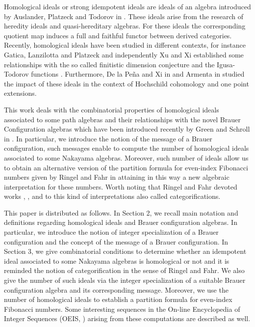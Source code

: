 \documentclass[10pt,twoside]{article}
\theoremstyle{definition}
\begin{document}
Homological ideals or strong idempotent ideals are ideals of an algebra introduced by  Auslander, Platzeck and Todorov in \cite{Auslander}. These ideals arise from the research of  heredity ideals and quasi-hereditary algebras. For these ideals the corresponding quotient map induces a full and faithful functor between derived categories. Recently, homological ideals have been studied in different contexts, for instance Gatica, Lanzilotta and Platzeck and independently Xu and Xi established some relationships with the so called finitistic dimension conjecture and the Igusa-Todorov functions \cite{Gatica}. Furthermore, De la Pe\~na and Xi  in \cite{JAP} and Armenta in \cite{Armenta} studied the impact of these ideals in the context of Hochschild cohomology and one point extensions.
\par\bigskip
This work deals with the combinatorial properties of homological ideals associated to some path algebras and their relationships with the novel Brauer Configuration algebras which have been introduced recently by Green and Schroll in \cite{Green}. In particular, we introduce the notion of the message of a Brauer configuration, such messages enable to compute the number of homological ideals associated to some Nakayama algebras. Moreover, such number of ideals allow us to obtain an alternative version of the partition formula  for even-index Fibonacci numbers given by Ringel and Fahr in \cite{Fahr1} attaining in this way a new algebraic interpretation for these numbers. Worth noting that Ringel and Fahr devoted works \cite{Fahr1}, \cite{Fahr2}, and \cite{Fahr3} to this kind of interpretations also called categorifications. \par\bigskip  



This paper is distributed as follows. In Section 2, we recall main notation and definitions regarding homological ideals and Brauer configuration algebras. In particular, we introduce the notion of integer specialization of a Brauer configuration and the concept of the message of a Brauer configuration. In Section 3, we give combinatorial conditions to determine whether an idempotent ideal associated to some Nakayama algebras is homological or not and it is reminded the notion of categorification in the sense of Ringel and Fahr. We also give the number of such ideals via the integer specialization of a suitable Brauer configuration algebra and its corresponding message. Moreover, we use the number of homological ideals to establish a partition formula for even-index Fibonacci numbers. Some interesting sequences in the On-line Encyclopedia of Integer Sequences (OEIS, \cite{OEIS}) arising from these computations are described as well.
\end{document}
